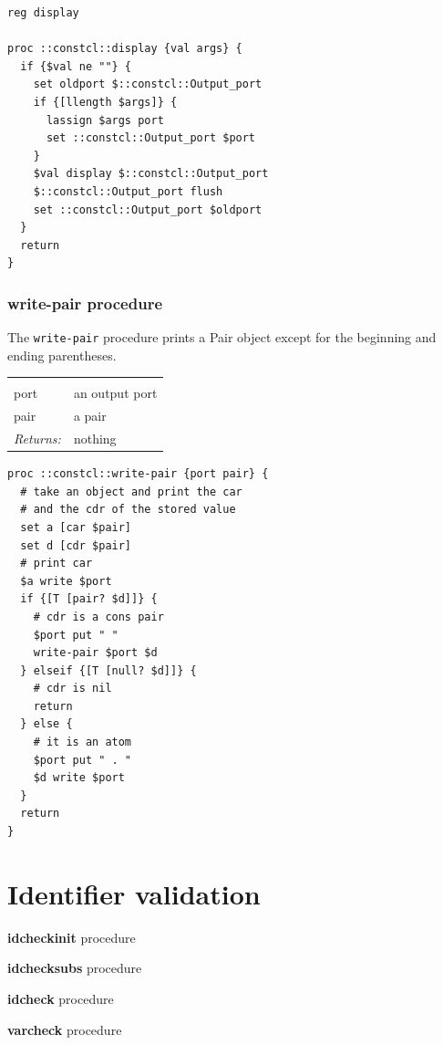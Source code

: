 \documentclass[twoside]{report}
\begin{document}
\begin{lstlisting}
reg display

proc ::constcl::display {val args} {
  if {$val ne ""} {
    set oldport $::constcl::Output_port
    if {[llength $args]} {
      lassign $args port
      set ::constcl::Output_port $port
    }
    $val display $::constcl::Output_port
    $::constcl::Output_port flush
    set ::constcl::Output_port $oldport
  }
  return
}
\end{lstlisting}

\subsection{write-pair procedure}
\label{writepair-procedure}

The \texttt{write-pair} procedure prints a Pair object except for the beginning and ending parentheses.

\noindent\begin{tabular}{ |p{1.9cm} p{8cm}| }
\hline
\rowcolor[HTML]{CCCCCC} \multicolumn{2}{|l|}{\bf write-pair (internal)} \\
port & an output port \\
pair & a pair \\
\textit{Returns:} & nothing \\
\hline
\end{tabular}

\begin{lstlisting}
proc ::constcl::write-pair {port pair} {
  # take an object and print the car
  # and the cdr of the stored value
  set a [car $pair]
  set d [cdr $pair]
  # print car
  $a write $port
  if {[T [pair? $d]]} {
    # cdr is a cons pair
    $port put " "
    write-pair $port $d
  } elseif {[T [null? $d]]} {
    # cdr is nil
    return
  } else {
    # it is an atom
    $port put " . "
    $d write $port
  }
  return
}
\end{lstlisting}

\chapter{Identifier validation}
\label{identifier-validation}

\textbf{idcheckinit} procedure

\noindent \textbf{idchecksubs} procedure

\noindent \textbf{idcheck} procedure

\noindent \textbf{varcheck} procedure
\end{document}

